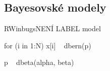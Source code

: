 \documentclass[
  11pt,
  a4paper]{report}
\begin{document}
\printbibliography[title={\bibnamex},heading={bibintoc}]

\part*{\Prilohy\thispagestyle{empty}}
\appendix

\chapter{Bayesovské modely}\label{bayesovskuxe9-modely}

\begin{model}{R}{Winbugs}{NENÍ LABEL}
model {
    for (i in 1:N) {
        x[i] ~ dbern(p)
    }

    p ~ dbeta(alpha, beta)
}
\end{model}
\end{document}
